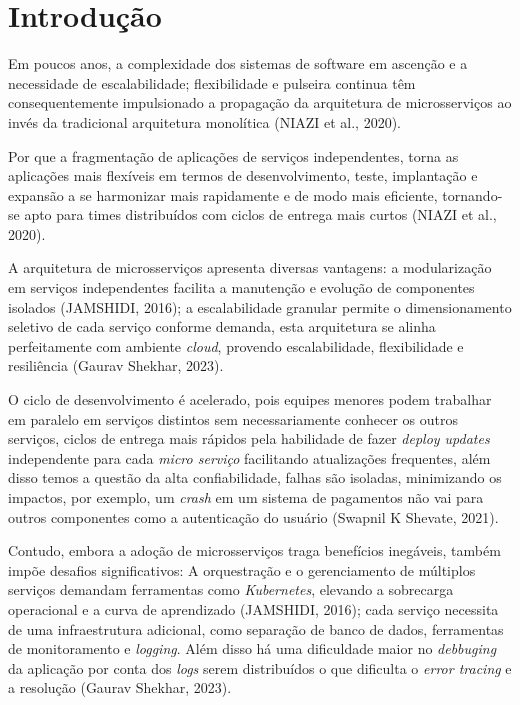 \chapter{Introdução} \label{cap:Introducao}

Em poucos anos, a complexidade dos sistemas de software em ascenção e a necessidade de escalabilidade; flexibilidade e pulseira continua têm consequentemente impulsionado a propagação da arquitetura de microsserviços ao invés da tradicional arquitetura monolítica (NIAZI et al., 2020).

Por que a fragmentação de aplicações de serviços independentes, torna as aplicações mais flexíveis em termos de desenvolvimento, teste, implantação e expansão a se harmonizar mais rapidamente e de modo mais eficiente, tornando-se apto para times distribuídos com ciclos de entrega mais curtos (NIAZI et al., 2020).

A arquitetura de microsserviços apresenta diversas vantagens: a modularização em serviços independentes facilita a manutenção e evolução de componentes isolados (JAMSHIDI, 2016); a escalabilidade granular permite o dimensionamento seletivo de cada serviço conforme demanda, esta arquitetura se alinha perfeitamente com ambiente \textit{cloud}, provendo escalabilidade, flexibilidade e resiliência (Gaurav Shekhar, 2023).

O ciclo de desenvolvimento é acelerado, pois equipes menores podem trabalhar em paralelo em serviços distintos sem necessariamente conhecer os outros serviços, ciclos de entrega mais rápidos pela habilidade de fazer \textit{deploy updates} independente para cada \textit{micro serviço} facilitando atualizações frequentes, além disso temos a questão da alta confiabilidade, falhas são isoladas, minimizando os impactos, por exemplo, um \textit{crash} em um sistema de pagamentos não vai para outros componentes como a autenticação do usuário (Swapnil K Shevate, 2021).

Contudo, embora a adoção de microsserviços traga benefícios inegáveis, também impõe desafios significativos: A orquestração e o gerenciamento de múltiplos serviços demandam ferramentas como \textit{Kubernetes}, elevando a sobrecarga operacional e a curva de aprendizado (JAMSHIDI, 2016); cada serviço necessita de uma infraestrutura adicional, como separação de banco de dados, ferramentas de monitoramento e \textit{logging}. Além disso há uma dificuldade maior no \textit{debbuging} da aplicação por conta dos \textit{logs} serem distribuídos o que dificulta o \textit{error tracing} e a resolução (Gaurav Shekhar, 2023).

